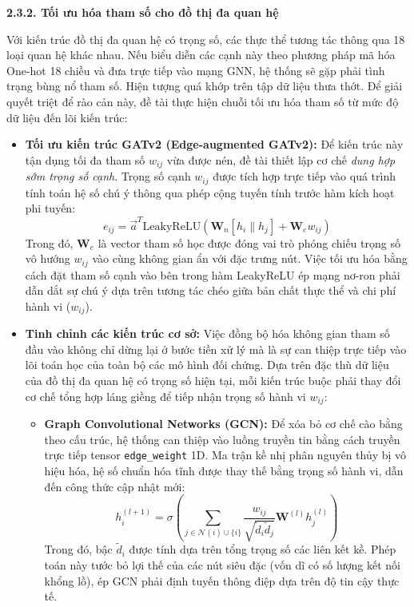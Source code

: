 
\textbf{2.3.2. Tối ưu hóa tham số cho đồ thị đa quan hệ}\vspace{0.2cm}

Với kiến trúc đồ thị đa quan hệ có trọng số, các thực thể tương tác thông qua 18 loại quan hệ khác nhau. Nếu biểu diễn các cạnh này theo phương pháp mã hóa One-hot 18 chiều và đưa trực tiếp vào mạng GNN, hệ thống sẽ gặp phải tình trạng bùng nổ tham số. Hiện tượng quá khớp trên tập dữ liệu thưa thớt. Để giải quyết triệt để rào cản này, đề tài thực hiện chuỗi tối ưu hóa tham số từ mức độ dữ liệu đến lõi kiến trúc:

\begin{itemize}[label={--}, itemsep=5pt]
        \item \textbf{Tối ưu kiến trúc GATv2 (Edge-augmented GATv2):} Để kiến trúc này tận dụng tối đa tham số $w_{ij}$ vừa được nén, đề tài thiết lập cơ chế \textit{dung hợp sớm trọng số cạnh}. Trọng số cạnh $w_{ij}$ được tích hợp trực tiếp vào quá trình tính toán hệ số chú ý thông qua phép cộng tuyến tính trước hàm kích hoạt phi tuyến:
        \[
            e_{ij} = \vec{a}^T \text{LeakyReLU}\left( \mathbf{W}_n [h_i \| h_j] + \mathbf{W}_e w_{ij} \right)
        \]
        Trong đó, $\mathbf{W}_e$ là vector tham số học được đóng vai trò phóng chiếu trọng số vô hướng $w_{ij}$ vào cùng không gian ẩn với đặc trưng nút. Việc tối ưu hóa bằng cách đặt tham số cạnh vào bên trong hàm LeakyReLU ép mạng nơ-ron phải dẫn dắt sự chú ý dựa trên tương tác chéo giữa bản chất thực thể và chi phí hành vi ($w_{ij}$).

        \item \textbf{Tinh chỉnh các kiến trúc cơ sở:} Việc đồng bộ hóa không gian tham số đầu vào không chỉ dừng lại ở bước tiền xử lý mà là sự can thiệp trực tiếp vào lõi toán học của toàn bộ các mô hình đối chứng. Dựa trên đặc thù dữ liệu của đồ thị đa quan hệ có trọng số hiện tại, mỗi kiến trúc buộc phải thay đổi cơ chế tổng hợp láng giềng để tiếp nhận trọng số hành vi $w_{ij}$:

        \begin{itemize}[label={+}, itemsep=4pt]

            \item \textbf{Graph Convolutional Networks (GCN):} Để xóa bỏ cơ chế cào bằng theo cấu trúc, hệ thống can thiệp vào luồng truyền tin bằng cách truyền trực tiếp tensor \texttt{edge\_weight} 1D. Ma trận kề nhị phân nguyên thủy bị vô hiệu hóa, hệ số chuẩn hóa tĩnh được thay thế bằng trọng số hành vi, dẫn đến công thức cập nhật mới:
            \[
                h_i^{(l+1)} = \sigma \left( \sum_{j \in \mathcal{N}(i) \cup \{i\}} \frac{w_{ij}}{\sqrt{\tilde{d}_i \tilde{d}_j}} \mathbf{W}^{(l)} h_j^{(l)} \right)
            \]
            Trong đó, bậc $\tilde{d}_i$ được tính dựa trên tổng trọng số các liên kết kề. Phép toán này tước bỏ lợi thế của các nút siêu đặc (vốn dĩ có số lượng kết nối khổng lồ), ép GCN phải định tuyến thông điệp dựa trên độ tin cậy thực tế.


\end{itemize}
\end{itemize}
